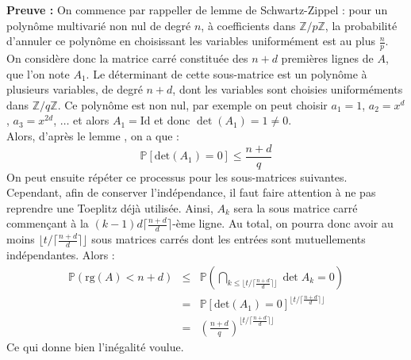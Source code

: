 \documentclass[11pt,a4paper]{article}
\begin{document}
\textbf{Preuve :}
On commence par rappeller de lemme de Schwartz-Zippel : pour un polynôme multivarié non nul de degré $n$, à coefficients dans $\mathbb{Z}/p\mathbb{Z}$, la probabilité d'annuler ce polynôme en choisissant les variables uniformément est au plus $\frac{n}{p}$. \\
On considère donc la matrice carré constituée des $n+d$ premières lignes de $A$, que l'on note $A_1$. Le déterminant de cette sous-matrice est un polynôme à plusieurs variables, de degré $n+d$, dont les variables sont choisies uniforméments dans $\mathbb{Z}/q\mathbb{Z}$. Ce polynôme est non nul, par exemple on peut choisir $a_1=1$, $a_2= x^d$, $a_3=x^{2d}$, $\dots$ et alors $A_1 = \text{Id}$ et donc $\det(A_1)=1\neq 0$.
\\ Alors, d'après le lemme , on a que : \[\mathbb{P}[\text{det}(A_1)=0] \leq \frac{n+d}{q}\]
On peut ensuite répéter ce processus pour les sous-matrices suivantes. Cependant, afin de conserver l'indépendance, il faut faire attention à ne pas reprendre une Toeplitz déjà utilisée. Ainsi, $A_k$ sera la sous matrice carré commençant à la $ (k-1)d\lceil \frac{n+d}{d} \rceil $-ème ligne. Au total, on pourra donc avoir au moins $\lfloor t/\lceil\frac{n+d}{d}\rceil\rfloor$ sous matrices carrés dont les entrées sont mutuellements indépendantes. Alors : 
\begin{eqnarray*}
\mathbb{P}(\text{rg}(A)<n+d) &\leq& \mathbb{P}(\bigcap_{k\leq\lfloor t/\lceil\frac{n+d}{d}\rceil\rfloor} \det{A_k} = 0) \\
&=&\mathbb{P}[\text{det}(A_1)=0]^{\lfloor t/\lceil\frac{n+d}{d}\rceil\rfloor} \\
&=&  (\frac{n+d}{q})^{\lfloor t/\lceil\frac{n+d}{d}\rceil\rfloor}
\end{eqnarray*}
Ce qui donne bien l'inégalité voulue.

\printbibliography[heading=bibintoc, title={Références}]
\end{document}
